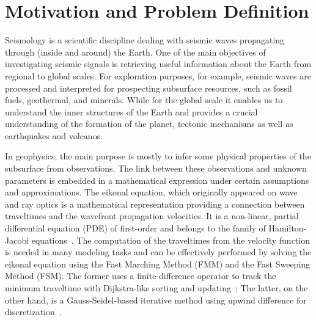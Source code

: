 \section{Motivation and Problem Definition}
\label{sec:motivation}

Seismology is a scientific discipline dealing with seismic waves propagating through (inside and around) the Earth.
One of the main objectives of investigating seismic signals is retrieving useful information about the Earth from regional to global scales. 
For exploration purposes, for example, seismic waves are processed and interpreted for prospecting subsurface resources, such as fossil fuels, geothermal, and minerals.
While for the global scale it enables us to understand the inner structures of the 
Earth and provides a crucial understanding of the formation of the planet, tectonic mechanisms as well as earthquakes and volcanos.

In geophysics, the main purpose is mostly to infer some physical properties of the subsurface from observations. 
The link between these observations and unknown parameters is embedded in a mathematical expression under certain assumptions and approximations. 
The eikonal equation, which originally appeared on wave and ray optics is a mathematical representation 
providing a connection between traveltimes and the wavefront propagation velocities.
It is a non-linear, partial differential equation (PDE) of first-order and belongs to 
the family of Hamilton-Jacobi equations~\cite{ko:90}. The computation of the traveltimes 
from the velocity function is needed in 
many modeling tasks and can be effectively performed by solving the eikonal equation using the 
Fast Marching Method (FMM) and the Fast Sweeping Method (FSM).
The former uses a finite-difference operator to track the minimum traveltime with Dijkstra-like sorting and updating~\cite{s:96}; 
The latter, on the other hand, 
is a Gauss-Seidel-based iterative 
method using upwind difference for
discretization~\cite{z:05}.

